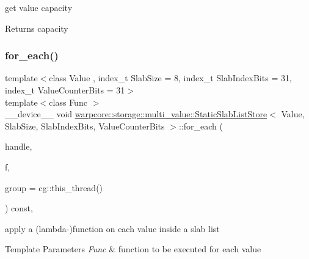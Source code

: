 get value capacity 

\begin{DoxyReturn}{Returns}
capacity 
\end{DoxyReturn}
\mbox{\label{classwarpcore_1_1storage_1_1multi__value_1_1StaticSlabListStore_ad156b26b427e55be66f74733b50f392d}} 
\subsubsection{\texorpdfstring{for\+\_\+each()}{for\_each()}}
{\footnotesize\ttfamily template$<$class Value , index\+\_\+t Slab\+Size = 8, index\+\_\+t Slab\+Index\+Bits = 31, index\+\_\+t Value\+Counter\+Bits = 31$>$ \\
template$<$class Func $>$ \\
\+\_\+\+\_\+device\+\_\+\+\_\+ void \hyperlink{classwarpcore_1_1storage_1_1multi__value_1_1StaticSlabListStore}{warpcore\+::storage\+::multi\+\_\+value\+::\+Static\+Slab\+List\+Store}$<$ Value, Slab\+Size, Slab\+Index\+Bits, Value\+Counter\+Bits $>$\+::for\+\_\+each (\begin{DoxyParamCaption}\item[{handle\+\_\+type}]{handle,  }\item[{Func}]{f,  }\item[{const cg\+::thread\+\_\+group \&}]{group = {\ttfamily cg\+:\+:this\+\_\+thread()} }\end{DoxyParamCaption}) const\hspace{0.3cm}{\ttfamily [inline]}, {\ttfamily [noexcept]}}



apply a (lambda-\/)function on each value inside a slab list 


\begin{DoxyTemplParams}{Template Parameters}
{\em Func} & function to be executed for each value \\
\hline
\end{DoxyTemplParams}

